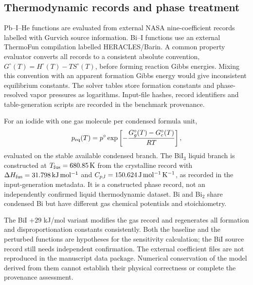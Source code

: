 \subsection{Thermodynamic records and phase treatment}
Pb--I--He functions are evaluated from external NASA nine-coefficient
records labelled with Gurvich source information. Bi--I functions use
an external ThermoFun compilation labelled HERACLES/Barin. A common
property evaluator converts all records to a consistent absolute
convention, $G^\circ(T)=H^\circ(T)-TS^\circ(T)$, before forming
reaction Gibbs energies. Mixing this convention with an apparent
formation Gibbs energy would give inconsistent equilibrium constants.
The solver tables store formation constants and phase-resolved vapor
pressures as logarithms. Input-file hashes, record identifiers and table-generation
scripts are recorded in the benchmark provenance.

For an iodide with one gas molecule per condensed formula unit,
\begin{equation}
 p_{\rm eq}(T)=p^\circ\exp\left[-\frac{G_g^\circ(T)
                                  -G_c^\circ(T)}{RT}\right],
 \label{eq:pv}
\end{equation}
evaluated on the stable available condensed branch. The BiI$_3$ liquid branch
is constructed at $T_{\rm fus}=680.85\,\mathrm{K}$ from the crystalline
record with $\Delta H_{\rm fus}=31.798\,\mathrm{kJ\,mol^{-1}}$ and
$C_{p,l}=150.624\,\mathrm{J\,mol^{-1}\,K^{-1}}$, as recorded in the
input-generation metadata. It is a constructed phase record, not an
independently confirmed liquid thermodynamic dataset. Bi and
Bi$_2$ share condensed Bi but have different gas chemical potentials
and stoichiometry.

The BiI $+29$ kJ/mol variant modifies the gas record and regenerates
all formation and disproportionation constants consistently. Both the
baseline and the perturbed functions are hypotheses for the
sensitivity calculation; the BiI source record still needs independent
confirmation. The external coefficient files are not reproduced in the
manuscript data package. Numerical conservation of the model derived
from them cannot establish their physical correctness or complete the
provenance assessment.

